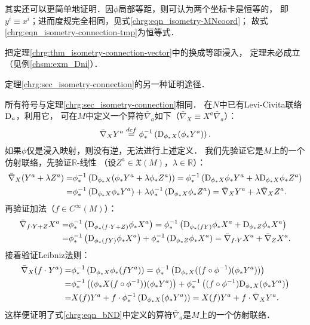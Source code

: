 \begin{remark}
    其实还可以更简单地证明．因$\phi$局部等距，则可认为两个坐标卡是恒等的，
    即$y^i\equiv x^i$；进而度规完全相同，见式\eqref{chrg:eqn_isometry-MNcoord}；
    故式\eqref{chrg:eqn_isometry-connection-tmp}为恒等式．
\end{remark}

\begin{remark}
    把定理\ref{chrg:thm_isometry-connection-vector}中的换成等距浸入，
    定理未必成立（见例\ref{chsm:exm_Dni}）．
\end{remark}

\begin{example}
	定理\ref{chrg:sec_isometry-connection}的另一种证明途径．
\end{example}
所有符号与定理\ref{chrg:sec_isometry-connection}相同．
在$N$中已有Levi-Civita联络${\rm D}_a$，利用它，
可在$M$中定义一个算符$\bar{\nabla}_a$如下（$\bar{\nabla}_X \equiv X^a\bar{\nabla}_a $）：
\begin{equation}\label{chrg:eqn_bND}
	\bar{\nabla}_X Y^a \overset{def}{=} \phi^{-1}_* \left( {\rm D}_{\phi_* X} (\phi_*Y^a) \right).
\end{equation}
如果$\phi$仅是浸入映射，则没有逆，无法进行上述定义．
我们先验证它是$M$上的一个仿射联络，先验证$\mathbb{R}$-线性
（设$Z^a \in \mathfrak{X}(M)$，$\lambda \in \mathbb{R}$）：
\begin{align*}
	\bar{\nabla}_X (Y^a + \lambda Z^a) =& \phi^{-1}_* \left( {\rm D}_{\phi_* X} (\phi_*Y^a +\lambda \phi_*Z^a)\right)
	= \phi^{-1}_* \left( {\rm D}_{\phi_* X}\phi_*Y^a +\lambda  {\rm D}_{\phi_* X} \phi_*Z^a\right)\\
	=& \phi^{-1}_* \left( {\rm D}_{\phi_* X}\phi_*Y^a\right) +\lambda  \phi^{-1}_* \left({\rm D}_{\phi_* X} \phi_*Z^a\right)
	=  \bar{\nabla}_X Y^a  + \lambda  \bar{\nabla}_X Z^a .
\end{align*}
再验证加法（$f\in C^\infty(M)$）：
\begin{align*}
	\bar{\nabla}_{f\cdot Y + Z} X^a =& \phi^{-1}_* \left( {\rm D}_{\phi_* (f\cdot Y+Z)} \phi_*X^a\right)
	=\phi^{-1}_* \left( {\rm D}_{\phi_* (f Y)} \phi_*X^a+ {\rm D}_{\phi_*Z} \phi_*X^a\right)\\
	=&\phi^{-1}_* \left( {\rm D}_{\phi_* (f Y)} \phi_*X^a\right)+\phi^{-1}_* \left( {\rm D}_{\phi_*Z} \phi_*X^a\right)
	=   \bar{\nabla}_{f\cdot Y } X^a  +\bar{\nabla}_{ Z} X^a .
\end{align*}
接着验证Leibniz法则：
\begin{align*}
	\bar{\nabla}_X (f\cdot Y^a ) =& \phi^{-1}_* \left( {\rm D}_{\phi_* X} \phi_* (fY^a) \right)
	= \phi^{-1}_* \left( {\rm D}_{\phi_* X} ((f\circ \phi^{-1})(\phi_* Y^a) )\right) \\
	=& \phi^{-1}_* \left(({\phi_* X} (f\circ \phi^{-1})) (\phi_* Y^a)\right) + 
	\phi^{-1}_* \left((f\circ \phi^{-1}) {\rm D}_{\phi_* X} (\phi_* Y^a )\right)  \\
	=& X(f) Y^a  +   f\cdot \phi^{-1}_* \left({\rm D}_{\phi_* X} (\phi_* Y^a )\right)  
	= X(f) Y^a  +   f\cdot \bar{\nabla}_X Y^a  . 
\end{align*}
这样便证明了式\eqref{chrg:eqn_bND}中定义的算符$\bar{\nabla}_a$是$M$上的一个仿射联络．

